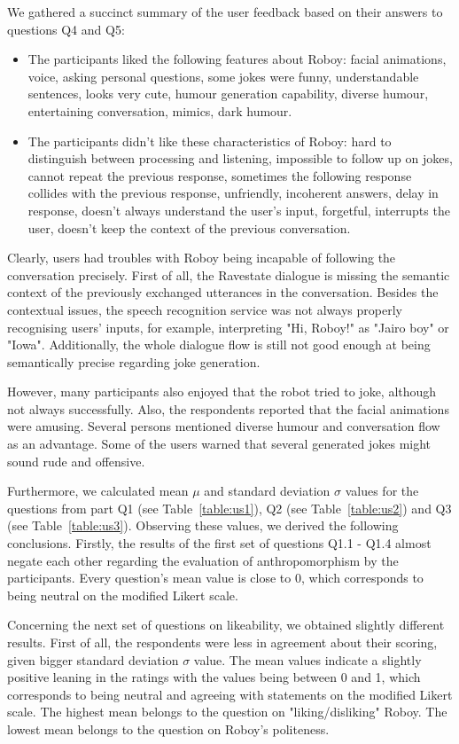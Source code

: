 We gathered a succinct summary of the user feedback based on their answers to questions Q4 and Q5:
\begin{itemize}
    \item The participants liked the following features about Roboy: facial animations, voice, asking personal questions, some jokes were funny, understandable sentences, looks very cute, humour generation capability, diverse humour, entertaining conversation, mimics, dark humour.
    \item The participants didn't like these characteristics of Roboy: hard to distinguish between processing and listening, impossible to follow up on jokes, cannot repeat the previous response, sometimes the following response collides with the previous response, unfriendly, incoherent answers, delay in response, doesn't always understand the user's input, forgetful, interrupts the user, doesn't keep the context of the previous conversation.
\end{itemize}
Clearly, users had troubles with Roboy being incapable of following the conversation precisely. First of all, the Ravestate dialogue is missing the semantic context of the previously exchanged utterances in the conversation. Besides the contextual issues, the speech recognition service was not always properly recognising users' inputs, for example, interpreting "Hi, Roboy!" as "Jairo boy" or "Iowa". Additionally, the whole dialogue flow is still not good enough at being semantically precise regarding joke generation.

However, many participants also enjoyed that the robot tried to joke, although not always successfully. Also, the respondents reported that the facial animations were amusing. Several persons mentioned diverse humour and conversation flow as an advantage. Some of the users warned that several generated jokes might sound rude and offensive.

Furthermore, we calculated mean \( \mu\) and standard deviation \( \sigma\) values for the questions from part Q1 (see Table~\ref{table:us1}), Q2 (see Table~\ref{table:us2}) and Q3 (see Table~\ref{table:us3}). Observing these values, we derived the following conclusions. Firstly, the results of the first set of questions Q1.1 - Q1.4 almost negate each other regarding the evaluation of anthropomorphism by the participants. Every question's mean value is close to 0, which corresponds to being neutral on the modified Likert scale.

Concerning the next set of questions on likeability, we obtained slightly different results. First of all, the respondents were less in agreement about their scoring, given bigger standard deviation \( \sigma\) value. The mean values indicate a slightly positive leaning in the ratings with the values being between 0 and 1, which corresponds to being neutral and agreeing with statements on the modified Likert scale. The highest mean belongs to the question on "liking/disliking" Roboy. The lowest mean belongs to the question on Roboy's politeness.

